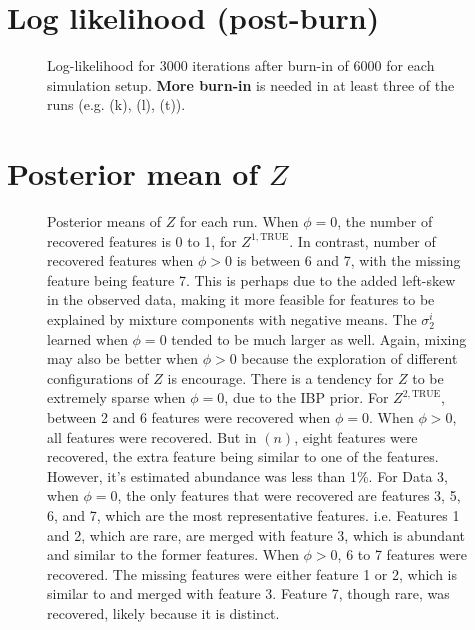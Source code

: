 \documentclass[10pt]{article} %
\def\true{\text{TRUE}}
\begin{document}
\newpage
\section{Log likelihood (post-burn)}
\begin{figure}[H]
  \begin{center}  %
  \end{center}
  \caption{Log-likelihood for 3000 iterations after burn-in of 6000 for each
  simulation setup. \textbf{More burn-in} is needed in at least three of the runs
  (e.g. (k), (l), (t)).}
  \label{fig:ll}
\end{figure}

\newpage
\section{Posterior mean of $Z$}
\begin{figure}[H]
  \begin{center}  %
  \end{center}
  \caption{Posterior means of $Z$ for each run. When $\phi=0$, the number of
  recovered features is 0 to 1, for $Z^{1,\true}$. In contrast, number of
  recovered features when $\phi > 0$ is between 6 and 7, with the missing
  feature being feature 7. This is perhaps due to the added left-skew in the observed
  data, making it more feasible for features to be explained by mixture components
  with negative means. The $\sigma_2^i$ learned when $\phi=0$ tended to be
  much larger as well. Again, mixing may also be better when $\phi>0$ because 
  the exploration of different configurations of $Z$ is encourage. There is a
  tendency for $Z$ to be extremely sparse when $\phi=0$, due to the IBP prior.
  For $Z^{2,\true}$, between 2 and 6 features were recovered when $\phi=0$.
  When $\phi > 0$, all features were recovered. But in $(n)$, 
  eight features were recovered, the extra feature being similar to one of the
  features. However, it's estimated abundance was less than 1\%.
  For Data 3, when $\phi=0$, the only features that were recovered are
  features 3, 5, 6, and 7, which are the most representative features. i.e.
  Features 1 and 2, which are rare, are merged with feature 3, which is
  abundant and similar to the former features. When $\phi>0$, 6 to 7 features were
  recovered. The missing features were either feature 1 or 2, which is similar to 
  and merged with feature 3. Feature 7, though rare, was recovered, likely because
  it is distinct.}
  \label{fig:zmean}
\end{figure}
 
\end{document}
